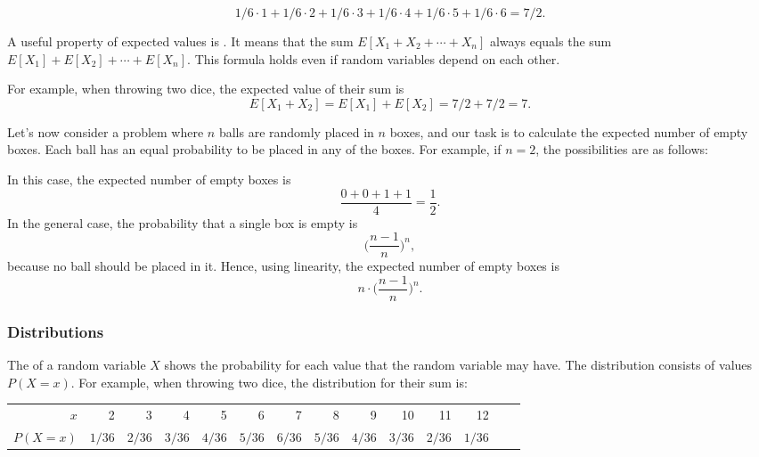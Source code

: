\[1/6 \cdot 1 + 1/6 \cdot 2 + 1/6 \cdot 3 + 1/6 \cdot 4 + 1/6 \cdot 5 + 1/6 \cdot 6 = 7/2.\]

A useful property of expected values is .
It means that the sum
$E[X_1+X_2+\cdots+X_n]$
always equals the sum
$E[X_1]+E[X_2]+\cdots+E[X_n]$.
This formula holds even if random variables
depend on each other.

For example, when throwing two dice,
the expected value of their sum is
\[E[X_1+X_2]=E[X_1]+E[X_2]=7/2+7/2=7.\]

Let's now consider a problem where
$n$ balls are randomly placed in $n$ boxes,
and our task is to calculate the expected
number of empty boxes.
Each ball has an equal probability to
be placed in any of the boxes.
For example, if $n=2$, the possibilities
are as follows:
\begin{center}
\end{center}
In this case, the expected number of
empty boxes is
\[\frac{0+0+1+1}{4} = \frac{1}{2}.\]
In the general case, the probability that a
single box is empty is
\[\Big(\frac{n-1}{n}\Big)^n,\]
because no ball should be placed in it.
Hence, using linearity, the expected number of
empty boxes is
\[n \cdot \Big(\frac{n-1}{n}\Big)^n.\]

\subsubsection{Distributions}


The  of a random variable $X$
shows the probability for each value that
the random variable may have.
The distribution consists of values $P(X=x)$.
For example, when throwing two dice,
the distribution for their sum is:
\begin{center}
\small {
\begin{tabular}{r|rrrrrrrrrrrrr}
$x$ & 2 & 3 & 4 & 5 & 6 & 7 & 8 & 9 & 10 & 11 & 12 \\
$P(X=x)$ & $1/36$ & $2/36$ & $3/36$ & $4/36$ & $5/36$ & $6/36$ & $5/36$ & $4/36$ & $3/36$ & $2/36$ & $1/36$ \\
\end{tabular}
}
\end{center}

